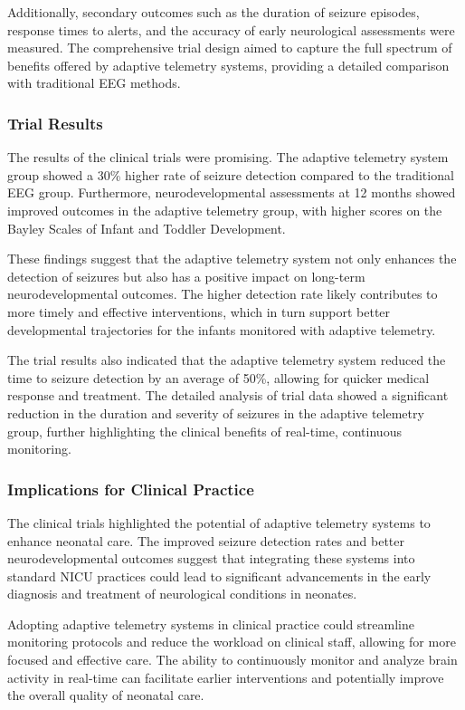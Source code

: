 \documentclass[12pt,journal,compsoc]{IEEEtran}
\begin{document}
Additionally, secondary outcomes such as the duration of seizure episodes, response times to alerts, and the accuracy of early neurological assessments were measured. The comprehensive trial design aimed to capture the full spectrum of benefits offered by adaptive telemetry systems, providing a detailed comparison with traditional EEG methods.

\subsubsection{Trial Results}

The results of the clinical trials were promising. The adaptive telemetry system group showed a 30\% higher rate of seizure detection compared to the traditional EEG group. Furthermore, neurodevelopmental assessments at 12 months showed improved outcomes in the adaptive telemetry group, with higher scores on the Bayley Scales of Infant and Toddler Development.

These findings suggest that the adaptive telemetry system not only enhances the detection of seizures but also has a positive impact on long-term neurodevelopmental outcomes. The higher detection rate likely contributes to more timely and effective interventions, which in turn support better developmental trajectories for the infants monitored with adaptive telemetry.

The trial results also indicated that the adaptive telemetry system reduced the time to seizure detection by an average of 50\%, allowing for quicker medical response and treatment. The detailed analysis of trial data showed a significant reduction in the duration and severity of seizures in the adaptive telemetry group, further highlighting the clinical benefits of real-time, continuous monitoring.

\subsubsection{Implications for Clinical Practice}

The clinical trials highlighted the potential of adaptive telemetry systems to enhance neonatal care. The improved seizure detection rates and better neurodevelopmental outcomes suggest that integrating these systems into standard NICU practices could lead to significant advancements in the early diagnosis and treatment of neurological conditions in neonates.

Adopting adaptive telemetry systems in clinical practice could streamline monitoring protocols and reduce the workload on clinical staff, allowing for more focused and effective care. The ability to continuously monitor and analyze brain activity in real-time can facilitate earlier interventions and potentially improve the overall quality of neonatal care.
\end{document}
